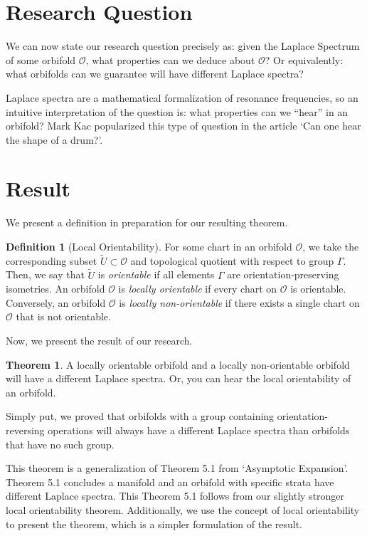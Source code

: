 \documentclass{article}[12pt]
\theoremstyle{definition}
\newtheorem*{definition}{Definition}
\newtheorem*{theorem*}{Theorem}
\begin{document}
\section{Research Question}
We can now state our research question precisely as: given the Laplace
Spectrum of some orbifold $\mathcal{O}$, what properties can we deduce about
$\mathcal{O}$? Or equivalently: what orbifolds can we guarantee will have
different Laplace spectra?

Laplace spectra are a mathematical formalization of resonance
frequencies, so an intuitive interpretation of the question is: what
properties can we ``hear'' in an orbifold? Mark Kac popularized this type
of question in the article `Can one hear the shape of a drum?'\cite{Kac}.

\section{Result}

We present a definition in preparation for our resulting theorem.

\begin{definition}[Local Orientability]

For some chart in an orbifold $\mathcal{O}$, we take the corresponding
subset $\widetilde{U} \subset \mathcal{O}$ and topological quotient with
respect to group $\Gamma$. Then, we say that $\widetilde{U}$ is
\emph{orientable} if all elements $\Gamma$ are orientation-preserving
isometries. An orbifold $\mathcal{O}$ is \emph{locally orientable} if
every chart on $\mathcal{O}$ is orientable.  Conversely, an orbifold
$\mathcal{O}$ is \emph{locally non-orientable} if there exists a single
chart on $\mathcal{O}$ that is not orientable.
\end{definition}

Now, we present the result of our research.

\begin{theorem*}
    A locally orientable orbifold and a locally non-orientable orbifold
    will have a different Laplace spectra. Or, you can hear the local
    orientability of an orbifold.
\end{theorem*}

Simply put, we proved that orbifolds with a group containing
orientation-reversing operations will always have a different Laplace
spectra than orbifolds that have no such group.

This theorem is a generalization of Theorem 5.1 from `Asymptotic
Expansion'\cite{DGGW}. Theorem 5.1 concludes a manifold and an orbifold
with specific strata have different Laplace spectra. This Theorem 5.1
follows from our slightly stronger local orientability theorem.
Additionally, we use the concept of local orientability to present the
theorem, which is a simpler formulation of the result.
\end{document}

